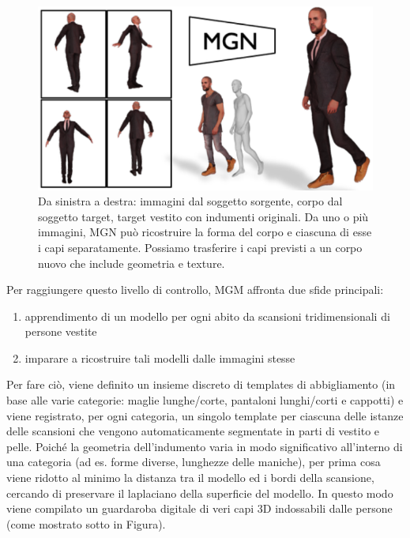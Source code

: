 \begin{figure}[ht!]
  \centering
  \includegraphics[scale=0.7]{Images/SizerPic/MultyGarmetNet.png}
  \caption{Da sinistra a destra: immagini dal soggetto sorgente, corpo dal
soggetto target, target vestito con indumenti originali. Da uno o
più immagini, MGN può ricostruire la forma del corpo e ciascuna di esse
i capi separatamente. Possiamo trasferire i capi previsti a
un corpo nuovo che include geometria e texture.}
    \label{fig:MultyGarmetNet}
\end{figure}

\newpage
Per raggiungere questo livello di controllo, MGM affronta due sfide principali:

\begin{enumerate}
\item apprendimento di un modello per ogni abito da scansioni tridimensionali di persone vestite
\item imparare a ricostruire tali modelli dalle immagini stesse
\end{enumerate}

\medskip

Per fare ciò, viene definito un insieme discreto di templates di abbigliamento (in base alle varie categorie: maglie lunghe/corte, pantaloni lunghi/corti e cappotti) e viene registrato, per ogni categoria, un singolo template per ciascuna delle istanze delle scansioni che vengono automaticamente segmentate in parti di vestito e pelle.
Poiché la geometria dell'indumento varia in modo significativo all'interno di una categoria (ad es. forme diverse, lunghezze delle maniche), per prima cosa viene ridotto al minimo la distanza tra il modello ed i bordi della scansione, cercando di preservare il laplaciano della superficie del modello.
In questo modo viene compilato un guardaroba digitale di veri capi 3D indossabili dalle persone (come mostrato sotto in Figura).

